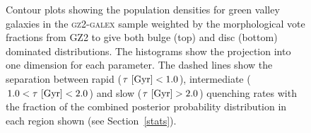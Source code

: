 \begin{figure}
\caption[Population densities of green smooth and disc galaxies]{Contour plots showing the population densities for green valley galaxies in the \textsc{gz2-galex} sample weighted by the morphological vote fractions from GZ2 to give both bulge (top) and disc (bottom) dominated distributions. The histograms show the projection into one dimension for each parameter. The dashed lines show the separation between rapid ($\tau ~\rm{[Gyr]} < 1.0$), intermediate ($1.0 < \tau ~\rm{[Gyr]} < 2.0$) and slow ($\tau ~\rm{[Gyr]} > 2.0$) quenching rates with the fraction of the combined posterior probability distribution in each region shown (see Section~\ref{stats}).}
\label{green_v}
\end{figure}

